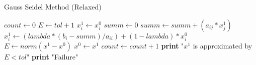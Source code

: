 \documentclass{article}
\begin{document}
  \begin{algorithm}
    \caption{Gauss Seidel Method (Relaxed)}
    \begin{algorithmic}[1]
        \State $count \gets 0$
        \State $E \gets tol + 1$
            \State $x_{i}^{1} \gets x_{i}^{0}$
          \EndFor
            \State $summ \gets 0$
                \State $summ \gets summ + (a_{ij} * x_{j}^{1})$
              \EndIf
            \EndFor
            \State $x_{i}^{1} \gets (lambda * (b_{i} - summ) / a_{ii}) + (1 - lambda) * x_{i}^{0}$
          \EndFor
          \State $E \gets norm(x^{1} - x^{0})$
          \State $x^{0} \gets x^{1}$
          \State $count \gets count + 1$
        \EndWhile
          \State \textbf{print} "$x^{1}$ is approximated by $E < tol$"
        \Else
            \State \textbf{print} "Failure"
        \EndIf
      \EndProcedure
    \end{algorithmic}
  \end{algorithm}
\end{document}
